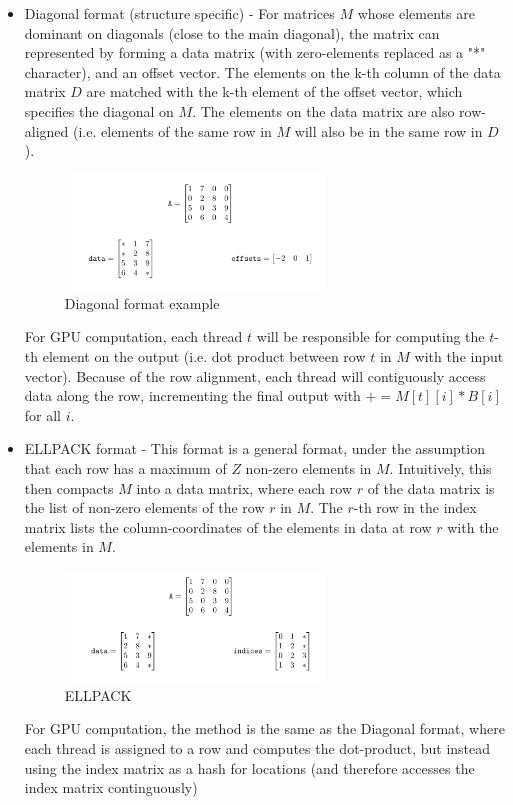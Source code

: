 \documentclass[12pt]{article}
\begin{document}
\begin{itemize}
\item Diagonal format (structure specific) - For matrices $M$ whose elements are dominant on diagonals (close to the main diagonal), the matrix can represented by forming a data matrix (with zero-elements replaced as a "*" character), and an offset vector. The elements on the k-th column of the data matrix $D$ are matched with the k-th element of the offset vector, which specifies the diagonal on $M$. The elements on the data matrix are also row-aligned (i.e. elements of the same row in $M$ will also be in the same row in $D$). 

\begin{figure}[h]
  \caption{Diagonal format example}
  \centering 
  \includegraphics[width = 0.65\textwidth]{diagonal.png}
\end{figure}



For GPU computation, each thread $t$ will be responsible for computing the $t$-th element on the output (i.e. dot product between row $t$ in $M$ with the input vector). Because of the row alignment, each thread will contiguously access data along the row, incrementing the final output with $+= M[t][i]*B[i] $ for all $i$. 
\item ELLPACK format - This format is a general format, under the assumption that each row has a maximum of $Z$ non-zero elements in $M$. Intuitively, this then compacts $M$ into a data matrix, where each row $r$ of the data matrix is the list of non-zero elements of the row $r$ in $M$. The $r$-th row in the index matrix lists the column-coordinates of the elements in data at row $r$ with the elements in $M$. 


\begin{figure}[h]
  \caption{ELLPACK}
  \centering 
  \includegraphics[width = 0.65\textwidth]{ellpack.png}
\end{figure}
For GPU computation, the method is the same as the Diagonal format, where each thread is assigned to a row and computes the dot-product, but instead using the index matrix as a hash for locations (and therefore accesses the index matrix continguously)


\end{itemize}
\end{document}
